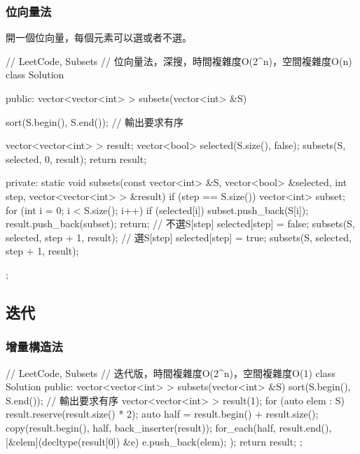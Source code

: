 \subsubsection{位向量法}
開一個位向量，每個元素可以選或者不選。

\begin{Code}
// LeetCode, Subsets
// 位向量法，深搜，時間複雜度O(2^n)，空間複雜度O(n)
class Solution {
public:
    vector<vector<int> > subsets(vector<int> &S) {
        sort(S.begin(), S.end());  // 輸出要求有序

        vector<vector<int> > result;
        vector<bool> selected(S.size(), false);
        subsets(S, selected, 0, result);
        return result;
    }

private:
    static void subsets(const vector<int> &S, vector<bool> &selected, int step,
            vector<vector<int> > &result) {
        if (step == S.size()) {
            vector<int> subset;
            for (int i = 0; i < S.size(); i++) {
                if (selected[i]) subset.push_back(S[i]);
            }
            result.push_back(subset);
            return;
        }
        // 不選S[step]
        selected[step] = false;
        subsets(S, selected, step + 1, result);
        // 選S[step]
        selected[step] = true;
        subsets(S, selected, step + 1, result);
    }
};
\end{Code}


\subsection{迭代}


\subsubsection{增量構造法}
\begin{Code}
// LeetCode, Subsets
// 迭代版，時間複雜度O(2^n)，空間複雜度O(1)
class Solution {
public:
    vector<vector<int> > subsets(vector<int> &S) {
        sort(S.begin(), S.end()); // 輸出要求有序
        vector<vector<int> > result(1);
        for (auto elem : S) {
            result.reserve(result.size() * 2);
            auto half = result.begin() + result.size();
            copy(result.begin(), half, back_inserter(result));
            for_each(half, result.end(), [&elem](decltype(result[0]) &e){
                e.push_back(elem);
            });
        }
        return result;
    }
};
\end{Code}


